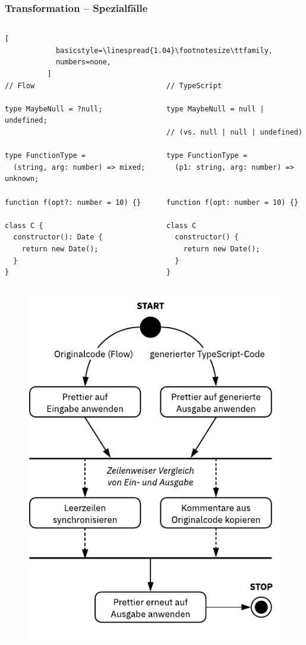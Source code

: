     \begin{frame}
      \frametitle{Transformation -- Spezialfälle}
      \begin{columns}
        \column{\dimexpr\paperwidth-11mm}
          \begin{lstlisting}[
            basicstyle=\linespread{1.04}\footnotesize\ttfamily,
            numbers=none,
          ]
// Flow                               // TypeScript

type MaybeNull = ?null;               type MaybeNull = null | undefined;
                                      // (vs. null | null | undefined)

type FunctionType =                   type FunctionType =
  (string, arg: number) => mixed;       (p1: string, arg: number) => unknown;

function f(opt?: number = 10) {}      function f(opt: number = 10) {}

class C {                             class C
  constructor(): Date {                 constructor() {
    return new Date();                    return new Date();
  }                                     }
}                                     }
        \end{lstlisting}
      \end{columns}
    \end{frame}

    \begin{frame}
      \begin{figure}
        \includegraphics[width=.62\textwidth]{src/figures/formatting.pdf}
      \end{figure}
    \end{frame}

